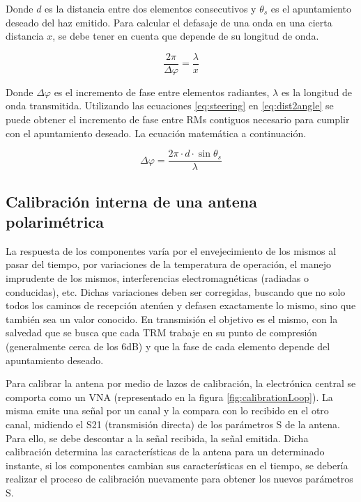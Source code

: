 Donde $d$ es la distancia entre dos elementos consecutivos y $\theta_s$ es el apuntamiento deseado del haz emitido. Para calcular
el defasaje de una onda en una cierta distancia $x$, se debe tener en cuenta que depende de su longitud de onda.

\begin{equation}
	\dfrac{2\pi}{\Delta\varphi} = \dfrac{\lambda}{x}
	\label{eq:dist2angle}
\end{equation}

Donde $\Delta\varphi$ es el incremento de fase entre elementos radiantes, $\lambda$ es la longitud de onda transmitida.
Utilizando las ecuaciones \ref{eq:steering} en \ref{eq:dist2angle} se puede obtener el incremento de fase entre RMs contiguos 
necesario para cumplir con el apuntamiento deseado. La ecuación matemática a continuación.

\begin{equation}
	\Delta\varphi = \dfrac{2\pi\cdot d\cdot\sin{\theta_s}}{\lambda}
\end{equation}

\subsection{Calibración interna de una antena polarimétrica}

La respuesta de los componentes varía por el envejecimiento de los mismos al pasar del tiempo, por variaciones de la temperatura
de operación, el manejo imprudente de los mismos, interferencias electromagnéticas (radiadas o conducidas), etc. Dichas 
variaciones deben ser corregidas, buscando que no solo todos los caminos de recepción atenúen y defasen exactamente lo
mismo, sino que también sea un valor conocido. En transmisión el objetivo es el mismo, con la salvedad que se busca que cada
TRM trabaje en su punto de compresión (generalmente cerca de los 6dB) y que la fase de cada elemento depende del apuntamiento
deseado.

Para calibrar la antena por medio de lazos de calibración, la electrónica central se comporta como un VNA (representado en la 
figura \ref{fig:calibrationLoop}). La misma emite una señal por un canal y la compara con lo recibido en el otro canal, 
midiendo el S21 (transmisión directa) de los parámetros S de la antena. Para ello, se debe descontar a la señal recibida, la 
señal emitida. Dicha calibración determina las características de la antena para un determinado instante, si los componentes 
cambian sus características en el tiempo, se debería realizar el proceso de calibración nuevamente para obtener los nuevos 
parámetros S.

